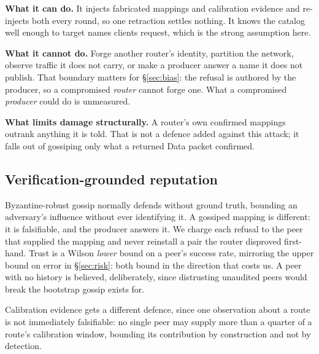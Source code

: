 \documentclass[conference,a4paper]{IEEEtran}
\begin{document}
\textbf{What it can do.} It injects fabricated mappings and calibration
evidence and re-injects both every round, so one retraction settles nothing.
It knows the catalog well enough to target names clients request, which is
the strong assumption here.

\textbf{What it cannot do.} Forge another router's identity, partition the
network, observe traffic it does not carry, or make a producer answer a name
it does not publish. That boundary matters for \S\ref{sec:bias}: the refusal
is authored by the producer, so a compromised \emph{router} cannot forge one.
What a compromised \emph{producer} could do is unmeasured.

\textbf{What limits damage structurally.} A router's own confirmed mappings
outrank anything it is told. That is not a defence added against this attack;
it falls out of gossiping only what a returned Data packet confirmed.

\subsection{Verification-grounded reputation}

Byzantine-robust gossip normally defends without ground truth, bounding an
adversary's influence without ever identifying it. A gossiped mapping is
different: it is falsifiable, and the producer answers it. We charge each
refusal to the peer that supplied the mapping and never reinstall a pair the
router disproved first-hand. Trust is a Wilson \emph{lower} bound on a peer's
success rate, mirroring the upper bound on error in \S\ref{sec:risk}: both
bound in the direction that costs us. A peer with no history is believed,
deliberately, since distrusting unaudited peers would break the bootstrap
gossip exists for.

Calibration evidence gets a different defence, since one observation about a
route is not immediately falsifiable: no single peer may supply more than a
quarter of a route's calibration window, bounding its contribution by
construction and not by detection.
\end{document}
